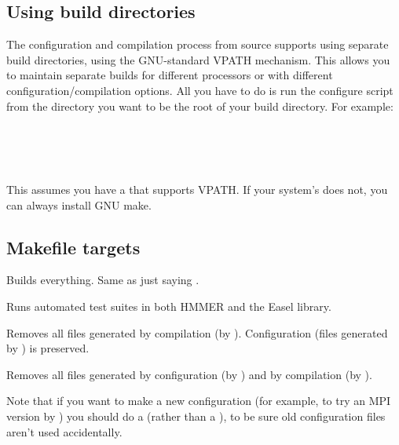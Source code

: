 \subsection{Using build directories}

The configuration and compilation process from source supports using
separate build directories, using the GNU-standard VPATH
mechanism. This allows you to maintain separate builds for different
processors or with different configuration/compilation options. All
you have to do is run the configure script from the directory you want
to be the root of your build directory.  For example:

\\
\\
\\

This assumes you have a  that supports VPATH. If your
system's  does not, you can always install GNU make.

\subsection{Makefile targets}

\begin{sreitems}{}

\item[\emprog{all}]
  Builds everything. Same as just saying .

\item[\emprog{check}]
  Runs automated test suites in both HMMER and the Easel library.

\item[\emprog{clean}]
  Removes all files generated by compilation (by
  ). Configuration (files generated by
  ) is preserved.

\item[\emprog{distclean}]
  Removes all files generated by configuration (by )
  and by compilation (by ). 

  Note that if you want to make a new configuration (for example, to
  try an MPI version by ) you
  should do a  (rather than a ), to be sure old configuration files aren't used
  accidentally.
\end{sreitems}

